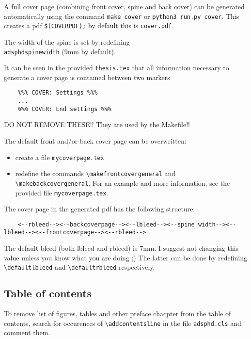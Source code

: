 A full cover page (combining front cover, spine and back cover) can be
generated automatically using the command \texttt{make cover} or \texttt{python3 run.py cover}. This creates a pdf
\texttt{\$(COVERPDF);} by default this is \texttt{cover.pdf}.

The width of the spine is set by redefining \texttt{\\adsphdspinewidth} (9mm by default).

It can be seen in the provided \texttt{thesis.tex} that all information necessary to
generate a cover page is contained between two markers

\begin{verbatim}
    %%% COVER: Settings %%%
    ...
    %%% COVER: End settings %%%
\end{verbatim}

DO NOT REMOVE THESE!! They are used by the Makefile!!

The default front and/or back cover page can be overwritten: 

\begin{itemize}
    \item create a file \texttt{mycoverpage.tex}
    \item redefine the commands \texttt{\textbackslash makefrontcovergeneral} and \texttt{\textbackslash makebackcovergeneral}. For
          an example and more information, see the provided file \texttt{mycoverpage.tex}.
\end{itemize}

The cover page in the generated pdf has the following structure:

{\tiny
\begin{verbatim}
    <--rbleed--><--backcoverpage--><--lbleed--><--spine width--><--lbleed--><--frontcoverpage--><--rbleed-->
\end{verbatim}
}

The default bleed (both lbleed and rbleed) is 7mm. I suggest not changing this
value unless you know what you are doing ;) The latter can be done by
redefining \texttt{\textbackslash defaultlbleed} and \texttt{\textbackslash defaultrbleed} respectively.


\subsection{Table of contents}

To remove list of figures, tables and other preface chacpter from the table of
contents, search for occurences of \texttt{\textbackslash addcontentsline} in the file
\texttt{adsphd.cls} and comment them.

